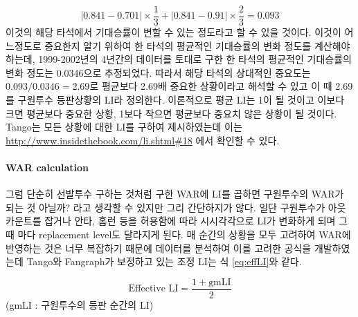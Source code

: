 \documentclass[11pt]{article}
\newcommand\abs[1]{\left|#1\right|}
\begin{document}
\begin{equation}
\label{eq:LI}
\abs{0.841-0.701} \times \frac{1}{3} + \abs{0.841-0.91} \times \frac{2}{3}=0.093
\end{equation}
이것의 해당 타석에서 기대승률이 변할 수 있는 정도라고 할 수 있을 것이다. 이것이 어느정도로 중요한지 알기 위하여 한 타석의 평균적인 기대승률의 변화 정도를 계산해야 하는데, 1999-2002년의 4년간의 데이터를 토대로 구한 한 타석의 평균적인 기대승률의 변화 정도는 0.0346으로 추정되었다. 따라서 해당 타석의 상대적인 중요도는 $0.093/0.0346=2.69$로 평균보다 2.69배 중요한 상황이라고 해석할 수 있고 이 때 2.69를 구원투수 등판상황의 LI라 정의한다. 이론적으로 평균 LI는 1이 될 것이고 이보다 크면 평균보다 중요한 상황, 1보다 작으면 평균보다 중요치 않은 상황이 될 것이다. Tango는 모든 상황에 대한 LI를 구하여 제시하였는데 이는 \url{http://www.insidethebook.com/li.shtml#18} 에서 확인할 수 있다.

\paragraph{WAR calculation}
그럼 단순히 선발투수 구하는 것처럼 구한 WAR에 LI를 곱하면 구원투수의 WAR가 되는 것 아닐까? 라고 생각할 수 있지만 그리 간단하지가 않다. 일단 구원투수가 아웃카운트를 잡거나 안타, 홈런 등을 허용함에 따라 시시각각으로 LI가 변화하게 되며 그 때 마다 replacement level도 달라지게 된다. 매 순간의 상황을 모두 고려하여 WAR에 반영하는 것은 너무 복잡하기 때문에 데이터를 분석하여 이를 고려한 공식을 개발하였는데 Tango와 Fangraph가 보정하고 있는 조정 LI는 식 \ref{eq:effLI}와 같다\cite{effLI}.

\begin{equation}
\label{eq:effLI}
\text{Effective LI} = \frac{1+\text{gmLI}}{2}
\end{equation}
(gmLI : 구원투수의 등판 순간의 LI)\\\\
\end{document}
